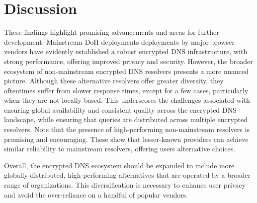 \section{Discussion}\label{sec:discussion} 

These findings highlight promising advancements and areas for further development. 
Mainstream DoH deployments deployments by major browser vendors have evidently established a robust encrypted DNS infrastructure, with strong performance,
offering improved privacy and security.  
However, the broader ecosystem of non-mainstream encrypted DNS resolvers presents a more nuanced picture. 
Although these alternative resolvers offer greater diversity, they oftentimes suffer from slower response times, except for a few cases, particularly when they are not locally based. 
This underscores the challenges associated with ensuring global availability and consistent quality across the encrypted DNS landscape, while ensuring that queries are distributed across multiple encrypted resolvers.
Note that the presence of high-performing non-mainstream resolvers is promising and encouraging. These show that lesser-known providers can achieve similar reliability to mainstream resolvers, offering
users alternative choices. 

Overall, the encrypted DNS ecosystem should be expanded to include more globally distributed, high-performing alternatives that are operated by a broader range of organizations. 
This diversification is necessary to enhance user privacy and avoid the over-reliance on a handful of popular vendors. 